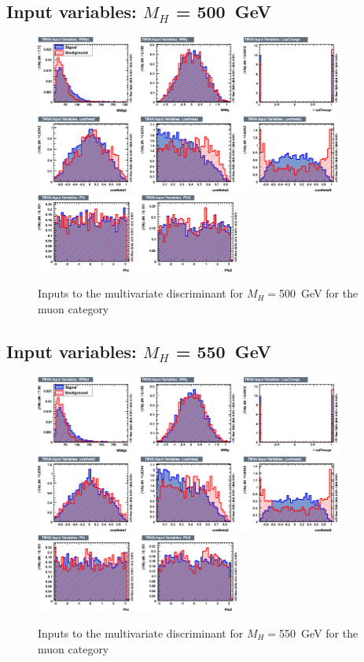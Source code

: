 \subsection{Input variables: \texorpdfstring{$M_H$}{M(H)} = 500~GeV}
\begin{figure}[ht]
  \centering
  \includegraphics[width=0.9\textwidth]{plots/2012_MVA/TMVA_500_nJ2_mu_variables_id_c1.png}
  \includegraphics[width=0.6\textwidth]{plots/2012_MVA/TMVA_500_nJ2_mu_variables_id_c2.png}	
  \caption{\label{fig:inputs500mu}Inputs to the multivariate discriminant for $M_H = $500~GeV for the muon category}
\end{figure}
\newpage
\subsection{Input variables: \texorpdfstring{$M_H$}{M(H)} = 550~GeV}
\begin{figure}[ht]
  \centering
  \includegraphics[width=0.9\textwidth]{plots/2012_MVA/TMVA_550_nJ2_mu_variables_id_c1.png}
  \includegraphics[width=0.6\textwidth]{plots/2012_MVA/TMVA_550_nJ2_mu_variables_id_c2.png}	
  \caption{\label{fig:inputs550mu}Inputs to the multivariate discriminant for $M_H = $550~GeV for the muon category}
\end{figure}
\newpage
